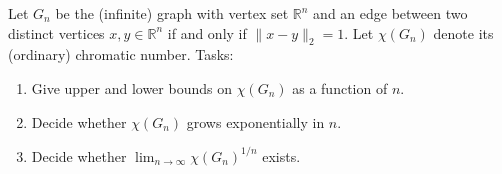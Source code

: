 Let $G_n$ be the (infinite) graph with vertex set $\mathbb{R}^n$ and an edge between two distinct vertices $x,y\in\mathbb{R}^n$ if and only if $\|x-y\|_2=1$.
Let $\chi(G_n)$ denote its (ordinary) chromatic number.
Tasks:
\begin{enumerate}
\item Give upper and lower bounds on $\chi(G_n)$ as a function of $n$.
\item Decide whether $\chi(G_n)$ grows exponentially in $n$.
\item Decide whether $\lim_{n\to\infty} \chi(G_n)^{1/n}$ exists.
\end{enumerate}

